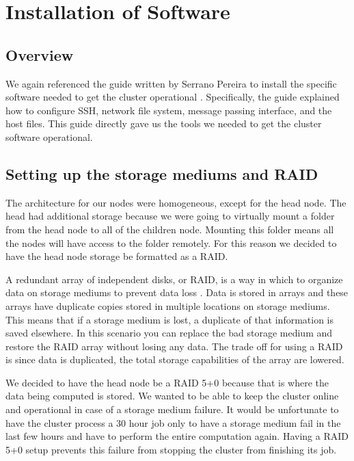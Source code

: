 \documentclass[12pt]{article}
\begin{document}
%
%
\section{Installation of Software}

\subsection{Overview}

We again referenced the guide written by Serrano Pereira to install the specific software needed to get the cluster operational \cite{pereira_2013}. Specifically, the guide explained how to configure SSH, network file system, message passing interface, and the host files. This guide directly gave us the tools we needed to get the cluster software operational.

\subsection{Setting up the storage mediums and RAID}

The architecture for our nodes were homogeneous, except for the head node. The head had additional storage because we were going to virtually mount a folder from the head node to all of the children node. Mounting this folder means all the nodes will have access to the folder remotely. For this reason we decided to have the head node storage be formatted as a RAID.

A redundant array of independent disks, or RAID, is a way in which to organize data on storage mediums to prevent data loss \cite{raid}. Data is stored in arrays and these arrays have duplicate copies stored in multiple locations on storage mediums. This means that if a storage medium is lost, a duplicate of that information is saved elsewhere. In this scenario you can replace the bad storage medium and restore the RAID array without losing any data. The trade off for using a RAID is since data is duplicated, the total storage capabilities of the array are lowered.

We decided to have the head node be a RAID 5+0 because that is where the data being computed is stored. We wanted to be able to keep the cluster online and operational in case of a storage medium failure. It would be unfortunate to have the cluster process a 30 hour job only to have a storage medium fail in the last few hours and have to perform the entire computation again. Having a RAID 5+0 setup prevents this failure from stopping the cluster from finishing its job.
\end{document}
